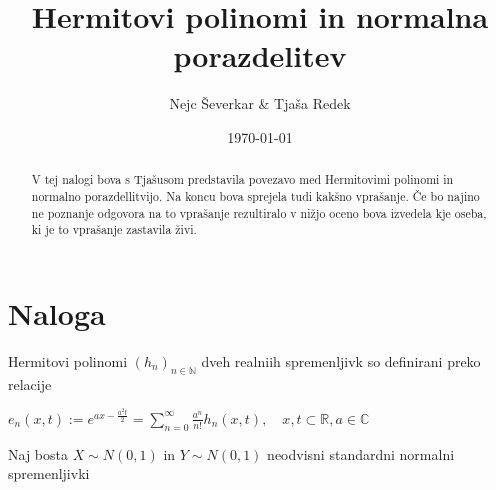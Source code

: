 \documentclass[letterpaper, notitlepage]{article}
\begin{document}
\title{Hermitovi polinomi in normalna porazdelitev}
\author{Nejc Ševerkar \& Tjaša Redek}
\date{\today}
\maketitle

\begin{abstract}
V tej nalogi bova s Tjašusom predstavila
povezavo med Hermitovimi polinomi in normalno porazdellitvijo.
Na koncu bova sprejela tudi kakšno vprašanje.
Če bo najino ne poznanje odgovora na to vprašanje
rezultiralo v nižjo oceno bova izvedela kje oseba, ki
je to vprašanje zastavila živi.
\end{abstract}
\pagebreak

\section*{Naloga}
Hermitovi polinomi $(h_n)_{n \in \mathbb{N}}$ dveh realniih spremenljivk
so definirani preko relacije \\

\begin{center}
$e_n(x, t) := e^{ax -\frac{a^2t}{2}} = \sum_{n=0}^{\infty} \frac{a^n}{n!} h_n(x, t), 
\quad {x, t} \subset \mathbb{R}, a \in \mathbb{C}$
\end{center}

Naj bosta $X \sim N(0, 1)$ in $Y \sim N(0, 1)$ neodvisni standardni normalni spremenljivki
\end{document}
